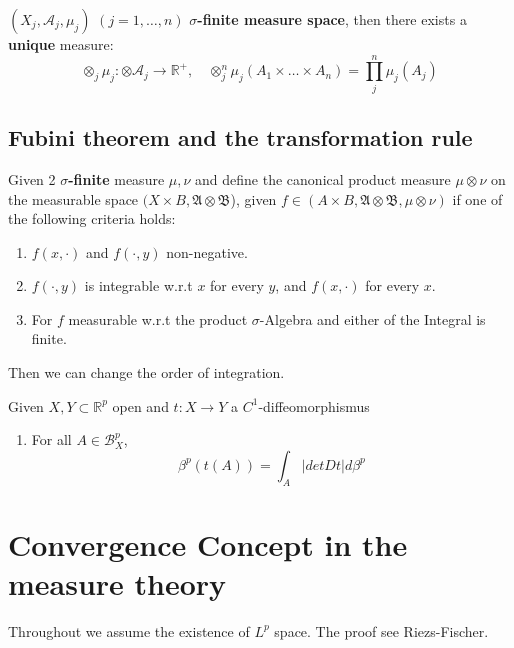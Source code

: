 \begin{theorem}
$(X_j, \mathcal{A}_j, \mu_j)$ $(j = 1, \dots, n)$ \textbf{$\sigma$-finite measure space}, then there exists a \textbf{unique} measure:
\begin{equation*}
	\otimes_j \mu_j : \otimes \mathcal{A}_j \rightarrow \mathbb{R}^+, 
	\quad \otimes_j^n \mu_j(A_1 \times \dots \times A_n) = \prod_j^n \mu_j(A_j)
\end{equation*}
\end{theorem}


\subsection{Fubini theorem and the transformation rule}


\begin{theorem}
	Given 2 \textbf{$\sigma$-finite} measure $\mu, \nu$ and define the canonical product measure $\mu \otimes \nu$ on the measurable space $(X \times B, \mathfrak{A} \otimes \mathfrak{B}$), given $f \in (A \times B, \mathfrak{A} \otimes \mathfrak{B}, \mu \otimes \nu)$ if one of the following criteria holds:
	\begin{enumerate}
		\item $f(x, \cdot)$ and $f(\cdot, y)$ non-negative.
		\item $f(\cdot, y)$ is integrable w.r.t $x$ for every $y$, and $f(x, \cdot)$ for every $x$.
		\item For $f$ measurable w.r.t the product $\sigma$-Algebra and either of the Integral is finite.
	\end{enumerate}
	Then we can change the order of integration.
\end{theorem}

\begin{theorem}
	Given $X, Y \subset \mathbb{R}^p$ open and $t: X \rightarrow Y$ a $C^1$-diffeomorphismus 
	\begin{enumerate}
		\item For all $A \in \mathcal{B}^p_X$, 
			\begin{equation*}
				\beta^p(t(A)) = \int_A |det Dt| d\beta^p
			\end{equation*}
	\end{enumerate}
\end{theorem}



\newpage
\section{Convergence Concept in the measure theory}
Throughout we assume the existence of $L^p$ space. The proof see Riezs-Fischer.



